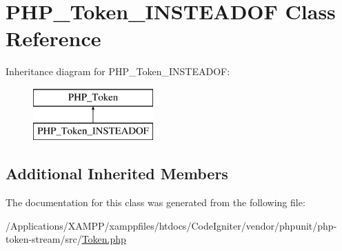\hypertarget{class_p_h_p___token___i_n_s_t_e_a_d_o_f}{}\section{P\+H\+P\+\_\+\+Token\+\_\+\+I\+N\+S\+T\+E\+A\+D\+OF Class Reference}
\label{class_p_h_p___token___i_n_s_t_e_a_d_o_f}
Inheritance diagram for P\+H\+P\+\_\+\+Token\+\_\+\+I\+N\+S\+T\+E\+A\+D\+OF\+:\begin{figure}[H]
\begin{center}
\leavevmode
\includegraphics[height=2.000000cm]{class_p_h_p___token___i_n_s_t_e_a_d_o_f}
\end{center}
\end{figure}
\subsection*{Additional Inherited Members}


The documentation for this class was generated from the following file\+:\begin{DoxyCompactItemize}
\item 
/\+Applications/\+X\+A\+M\+P\+P/xamppfiles/htdocs/\+Code\+Igniter/vendor/phpunit/php-\/token-\/stream/src/\mbox{\hyperlink{_token_8php}{Token.\+php}}\end{DoxyCompactItemize}
